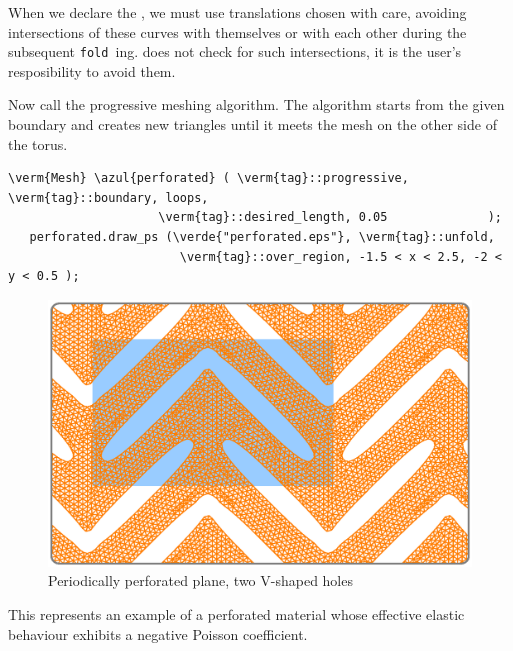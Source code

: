 When we declare the {\small\tt{}}, we must use translations chosen with care,
avoiding intersections of these curves with themselves or with each other during the subsequent
{\small\tt fold\,}ing.
\ManiFEM{} does not check for such intersections, it is the user's resposibility to avoid them.

Now call the progressive meshing algorithm.
The algorithm starts from the given boundary and creates new triangles until
it meets the mesh on the other side of the torus.

\begin{Verbatim}[commandchars=\\\{\},formatcom=\small\tt,frame=single,
   label=code not working,rulecolor=\color{coment},
   baselinestretch=0.94,framesep=2mm                                   ]
   \verm{Mesh} \azul{perforated} ( \verm{tag}::progressive, \verm{tag}::boundary, loops,
                     \verm{tag}::desired_length, 0.05              );
   perforated.draw_ps (\verde{"perforated.eps"}, \verm{tag}::unfold,
                        \verm{tag}::over_region, -1.5 < x < 2.5, -2 < y < 0.5 );
\end{Verbatim}

\begin{figure}[ht] \centering
  \includegraphics[width=120mm]{boomerang-3.eps}
  \caption{Periodically perforated plane, two V-shaped holes}
  \label{\numb section 7.\numb fig 14}
\end{figure}

This represents an example of a perforated material whose effective elastic behaviour
exhibits a negative Poisson coefficient.
